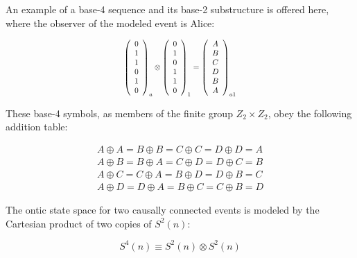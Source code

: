 \documentclass{article}
\begin{document}
An example of a base-4 sequence and its base-2 substructure is offered here, where the observer of the modeled event is Alice:

\begin{equation}
\scalebox{0.8}{$\begin{aligned}
  \left(\begin{array}{c}
0\\
1\\
1\\
0\\
1\\
0
\end{array}\right)_{a}\otimes\left(\begin{array}{c}
0\\
1\\
0\\
1\\
1\\
0
\end{array}\right)_{1}=\left(\begin{array}{c}
A\\
B\\
C\\
D\\
B\\
A
\end{array}\right)_{a1}
\end{aligned}$}
\label{eq: base-2 product}
\end{equation}

These base-4 symbols, as members of the finite group $Z_{2}\times Z_{2}$, obey the following addition table:

\begin{equation}
\begin{array}{c}
A\oplus A=B\oplus B=C\oplus C=D\oplus D=A\\
A\oplus B=B\oplus A=C\oplus D=D\oplus C=B\\
A\oplus C=C\oplus A=B\oplus D=D\oplus B=C\\
A\oplus D=D\oplus A=B\oplus C=C\oplus B=D
\end{array}\label{eq: base-4 addition table}
\end{equation}

The ontic state space for two causally connected events is modeled by the Cartesian product of two copies of $S^2(n)$:

\begin{equation}
    S^4(n)\equiv S^2(n)\otimes S^2(n)
    \label{eq: base-16 set}
\end{equation}
\end{document}
